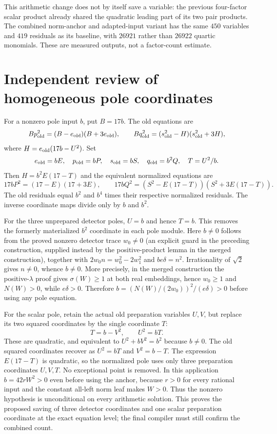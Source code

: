 This arithmetic change does not by itself save a variable: the previous
four-factor scalar product already shared the quadratic leading part of
its two pair products. The combined norm-anchor and adapted-input variant
has the same $450$ variables and $419$ residuals as its baseline, with
$26921$ rather than $26922$ quartic monomials. These are measured outputs,
not a factor-count estimate.

\section{Independent review of homogeneous pole coordinates}

For a nonzero pole input $b$, put $B=17b$. The old equations are
\[
 Bp_{\rm old}^2=(B-e_{\rm old})(B+3e_{\rm old}),\qquad
 Bq_{\rm old}^2=(s_{\rm old}^2-H)(s_{\rm old}^2+3H),
\]
where $H=e_{\rm old}(17b-U^2)$. Set
\[
 e_{\rm old}=bE,\quad p_{\rm old}=bP,\quad
 s_{\rm old}=bS,\quad q_{\rm old}=b^2Q,\quad T=U^2/b.
\]
Then $H=b^2E(17-T)$ and the equivalent normalized equations are
\[
 17bP^2=(17-E)(17+3E),\qquad
 17bQ^2=(S^2-E(17-T))(S^2+3E(17-T)).
\]
The old residuals equal $b^2$ and $b^4$ times their respective normalized
residuals. The inverse coordinate maps divide only by $b$ and $b^2$.

For the three unprepared detector poles, $U=b$ and hence $T=b$. This
removes the formerly materialized $b^2$ coordinate in each pole module.
Here $b\ne0$ follows from the proved nonzero detector trace $w_0\ne0$
(an explicit guard in the preceding construction, supplied instead by
the positive-product lemma in the merged construction), together with
$2w_0n=w_0^2-2w_1^2$ and $be\delta=n^2$. Irrationality of
$\sqrt2$ gives $n\ne0$, whence $b\ne0$.
More precisely, in the merged construction the positive-$\lambda$ proof
gives $\sigma(W)\ge1$ at both real embeddings, hence $w_0\ge1$ and
$N(W)>0$, while $e\delta>0$. Therefore
$b=(N(W)/(2w_0))^2/(e\delta)>0$ before using any pole equation.

For the scalar pole, retain the actual old preparation variables $U,V$,
but replace its two squared coordinates by the single coordinate $T$:
\[
 T=b-V^2,\qquad U^2=bT.
\]
These are quadratic, and equivalent to $U^2+bV^2=b^2$ because $b\ne0$.
The old squared coordinates recover as $U^2=bT$ and $V^2=b-T$.
The expression $E(17-T)$ is quadratic, so the normalized pole uses only
three preparation coordinates $U,V,T$. No exceptional point is removed.
In this application $b=42rW^2>0$ even before using the anchor, because
$r>0$ for every rational input and the constant all-left norm leaf makes
$W>0$. Thus the nonzero hypothesis is unconditional on every arithmetic
solution. This proves the proposed saving of three detector coordinates
and one scalar preparation coordinate at the exact equation level;
the final compiler must still confirm the combined count.
